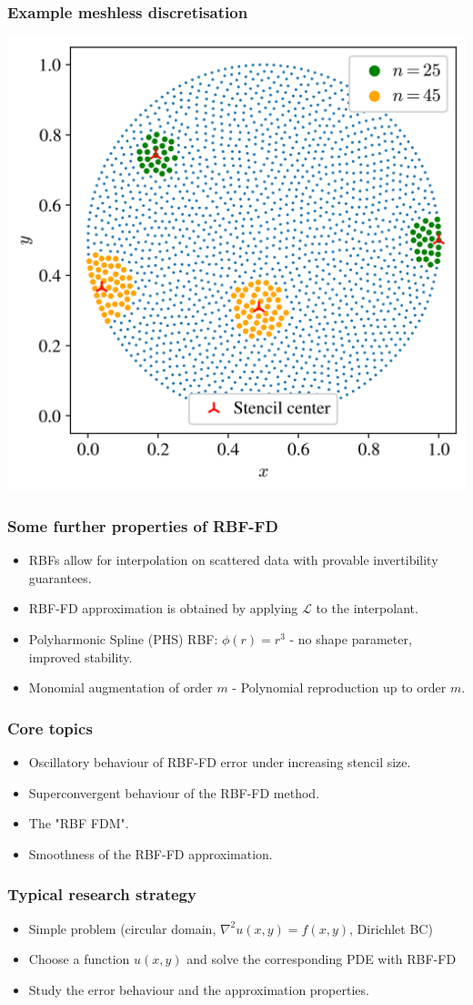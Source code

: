 \documentclass{beamer}
\begin{document}
\begin{frame}
\frametitle{Example meshless discretisation}
\includegraphics[width=.6\linewidth,center]{Figures/Discretisation.png}
\end{frame}

\begin{frame}
\frametitle{Some further properties of RBF-FD}
\begin{itemize}
\item<1-> RBFs allow for interpolation on scattered data with provable invertibility guarantees.
\item<2-> RBF-FD approximation is obtained by applying $\mathcal{L}$ to the interpolant.
\item<3-> Polyharmonic Spline (PHS) RBF: $\phi(r) = r^3$ - no shape parameter, improved stability.
\item<4-> Monomial augmentation of order $m$ - Polynomial reproduction up to order $m$.
\end{itemize}
\end{frame}

\begin{frame}
\frametitle{Core topics}
\begin{itemize}
\item<1-> Oscillatory behaviour of RBF-FD error under increasing stencil size.
\item<2-> Superconvergent behaviour of the RBF-FD method.
\item<3-> The "RBF FDM".
\item<4-> Smoothness of the RBF-FD approximation.
\end{itemize}
\end{frame}

\begin{frame}
\frametitle{Typical research strategy}
\begin{itemize}
\item<1-> Simple problem (circular domain, $\nabla^2 u(x,y) = f(x,y)$, Dirichlet BC)
\item<2-> Choose a function $u(x,y)$ and solve the corresponding PDE with RBF-FD
\item<3-> Study the error behaviour and the approximation properties.
\end{itemize}
\end{frame}
\end{document}
